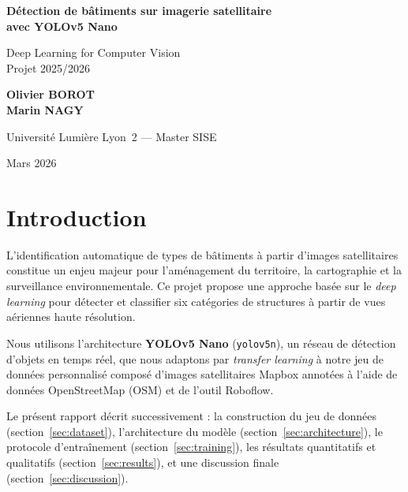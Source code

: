 \documentclass[12pt,a4paper]{article}
\begin{document}
\begin{titlepage}
\centering
\vspace*{2cm}

{\LARGE\bfseries Détection de bâtiments sur imagerie satellitaire\\[0.3em]
avec YOLOv5 Nano}

\vspace{1.5cm}
{\Large Deep Learning for Computer Vision\\[0.2em]
Projet 2025/2026}

\vspace{1.5cm}
{\large
\textbf{Olivier BOROT} \\[0.3em]
\textbf{Marin NAGY}
}

\vspace{1.5cm}
{\large
Université Lumière Lyon~2 --- Master SISE
}

\vspace{1cm}
{\large Mars 2026}

\vfill
\end{titlepage}

\tableofcontents
\newpage

\section{Introduction}

L'identification automatique de types de bâtiments à partir d'images satellitaires constitue un enjeu majeur pour l'aménagement du territoire, la cartographie et la surveillance environnementale. Ce projet propose une approche basée sur le \emph{deep learning} pour détecter et classifier six catégories de structures à partir de vues aériennes haute résolution.

Nous utilisons l'architecture \textbf{YOLOv5 Nano} (\texttt{yolov5n}), un réseau de détection d'objets en temps réel, que nous adaptons par \emph{transfer learning} à notre jeu de données personnalisé composé d'images satellitaires Mapbox annotées à l'aide de données OpenStreetMap (OSM) et de l'outil Roboflow.

Le présent rapport décrit successivement : la construction du jeu de données (section~\ref{sec:dataset}), l'architecture du modèle (section~\ref{sec:architecture}), le protocole d'entraînement (section~\ref{sec:training}), les résultats quantitatifs et qualitatifs (section~\ref{sec:results}), et une discussion finale (section~\ref{sec:discussion}).
\end{document}
